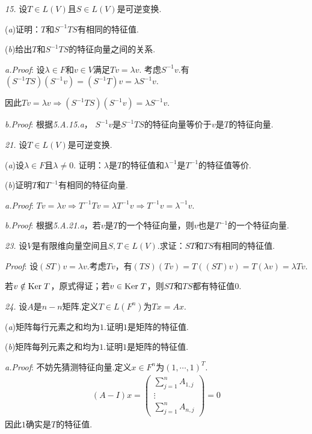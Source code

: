\hspace*{\fill}

\textit{15.}
设$T \in L(V)$且$S \in L(V)$是可逆变换.

(\textit{a})证明：$T$和$S^{-1}TS$有相同的特征值.

(\textit{b})给出$T$和$S^{-1}TS$的特征向量之间的关系.

\textit{a.Proof}:
设$\lambda \in F$和$v \in V$满足$Tv=\lambda v$.
考虑$S^{-1}v$.有$(S^{-1}TS)(S^{-1}v)=(S^{-1}T)v=\lambda S^{-1}v$.

因此$Tv=\lambda v \Rightarrow (S^{-1}TS)(S^{-1}v)=\lambda S^{-1}v$.

\textit{b.Proof}:
根据\textit{5.A.15.a}，
$S^{-1}v$是$S^{-1}TS$的特征向量等价于$v$是$T$的特征向量.

\hspace*{\fill}

\textit{21.}
设$T \in L(V)$是可逆变换.

(\textit{a})设$\lambda \in F$且$\lambda \ne 0$.
证明：$\lambda$是$T$的特征值和$\lambda^{-1}$是$T^{-1}$的特征值等价.

(\textit{b})证明$T$和$T^{-1}$有相同的特征向量.

\textit{a.Proof}:
$Tv=\lambda v \Rightarrow T^{-1}Tv=\lambda T^{-1}v \Rightarrow T^{-1}v=\lambda^{-1} v$.

\textit{b.Proof}:
根据\textit{5.A.21.a}，若$v$是$T$的一个特征向量，则$v$也是$T^{-1}$的一个特征向量.

\newpage

\textit{23.}
设$V$是有限维向量空间且$S,T \in L(V)$.求证：$ST$和$TS$有相同的特征值.

\textit{Proof}:
设$(ST)v=\lambda v$.考虑$Tv$，有$(TS)(Tv)=T((ST)v)=T(\lambda v)=\lambda Tv$.

若$v \notin \mathrm{Ker \;} T$，原式得证；若$v \in \mathrm{Ker \;} T$，则$ST$和$TS$都有特征值$0$.

\hspace*{\fill}

\textit{24.}
设$A$是$n-n$矩阵.定义$T \in L(F^n)$为$Tx=Ax$.

(\textit{a})矩阵每行元素之和均为$1$.证明$1$是矩阵的特征值.

(\textit{b})矩阵每列元素之和均为$1$.证明$1$是矩阵的特征值.

\textit{a.Proof}:
不妨先猜测特征向量.定义$x \in F^n$为$(1,\cdots,1)^T$.
    \begin{align*}
        (A-I)x=
            \begin{pmatrix}
                \sum_{j=1}^n A_{1,j} \\ \vdots \\ \sum_{j=1}^n A_{n,j}
            \end{pmatrix}
            =0
    \end{align*}
因此$1$确实是$T$的特征值.

